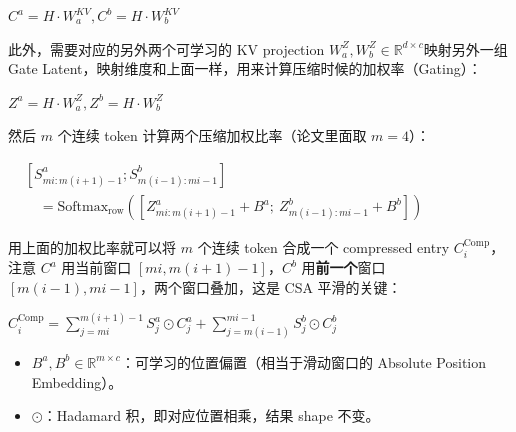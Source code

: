 \documentclass[zihao=false,fontset=windows]{ctexart}
\newcommand{\bigmath}[1]{%
  \begin{center}\large$\displaystyle #1$\end{center}%
}
\begin{document}
\bigmath{C^a=H\cdot W_a^{KV},C^b=H\cdot W_b^{KV}}

此外，需要对应的另外两个可学习的 KV projection $W_a^Z,W_b^Z\in\mathbb{R}^{d\times c}$映射另外一组 Gate Latent，映射维度和上面一样，用来计算压缩时候的加权率（Gating）：\par

\bigmath{Z^a=H\cdot W_a^Z,Z^b=H\cdot W_b^Z}

然后 $m$ 个连续 token 计算两个压缩加权比率（\textcolor{feishuRed}{论文里面取 }$m=4$）：\par

\bigmath{\begin{aligned}&[S^a_{mi:m(i+1)-1};S^b_{m(i-1):mi-1}]\\&\quad=\mathrm{Softmax}_{\mathrm{row}}\!\left([Z^a_{mi:m(i+1)-1}+B^a;\ Z^b_{m(i-1):mi-1}+B^b]\right)\end{aligned}}

用上面的加权比率就可以将 $m$ 个连续 token 合成一个 compressed entry $C_i^{\mathrm{Comp}}$，注意 $C^a$ 用当前窗口 $[mi,m(i+1)-1]$，$C^b$ 用\textbf{前一个}窗口 $[m(i-1),mi-1]$，\textcolor{feishuRed}{两个窗口叠加，这是 CSA 平滑的关键}：\par

\bigmath{C_i^{\mathrm{Comp}}=\sum_{j=mi}^{m(i+1)-1}S_j^a\odot C_j^a+\sum_{j=m(i-1)}^{mi-1}S_j^b\odot C_j^b}
\begin{itemize}
\item 
$B^a,B^b\in\mathbb{R}^{m\times c}$：可学习的位置偏置（\textcolor{feishuRed}{相当于滑动窗口的 Absolute Position Embedding}）。\par
\item 
$\odot$：Hadamard 积，即对应位置相乘，结果 shape 不变。\par
\end{itemize}

\par{}\vspace{0.8em}\par\vspace{0.28em}
\end{document}
